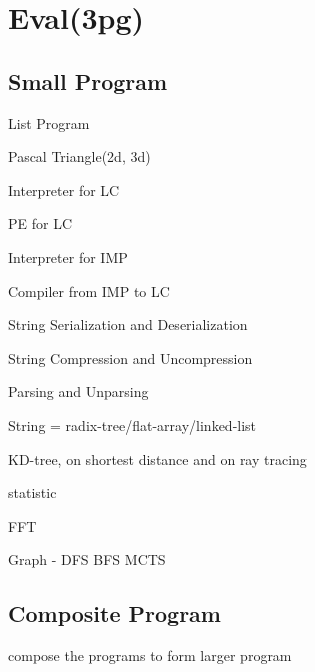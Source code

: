 \section{Eval(3pg)}
\subsection{Small Program}
List Program

Pascal Triangle(2d, 3d)

Interpreter for LC

PE for LC

Interpreter for IMP

Compiler from IMP to LC

String Serialization and Deserialization

String Compression and Uncompression

Parsing and Unparsing

String = radix-tree/flat-array/linked-list

KD-tree, on shortest distance and on ray tracing

statistic 

FFT

Graph - DFS BFS MCTS

\subsection{Composite Program}
compose the programs to form larger program